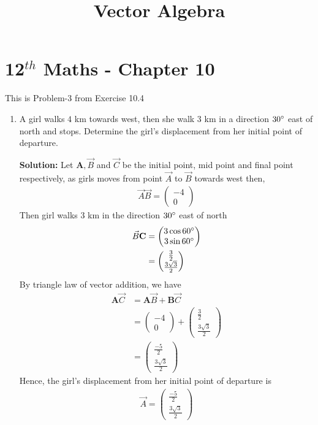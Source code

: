 \documentclass[12pt]{article}
\newcommand{\solution}{\noindent \textbf{Solution: }}
\newcommand{\myvec}[1]{\ensuremath{\begin{pmatrix}#1\end{pmatrix}}}
\let\vec\mathbf
\begin{document}
\begin{center}
\enlargethispage{-4cm}
\title{\textbf{Vector Algebra}}
\date{\vspace{-5ex}} %
\maketitle
\end{center}
\setcounter{page}{1}
\section*{12$^{th}$ Maths - Chapter 10}
This is Problem-3 from Exercise 10.4
\begin{enumerate}
\item A girl walks $4$ km towards west, then she walk $3$ km in a direction $30\degree$ east of north and stops. Determine the girl's displacement from her initial point of departure.

\solution 
Let $\vec{A}, \Vec{B}$ and $\Vec{C}$ be the initial point, mid point and final point respectively, as girls moves from point $\Vec{A}$ to $\Vec{B}$ towards west then,  
\begin{align}
 \Vec{A}\Vec{B}=\myvec{-4\\0}
\end{align}
Then girl walks 3 km in the direction $30\degree$ east of north
 \begin{align}
\Vec{B}\vec{C}&=\myvec{3\cos{60\degree}\\3\sin{60\degree}}\\
&=\myvec{\frac{3}{2}\\ \frac{3\sqrt{3}}{2}}
 \end{align}
 By triangle law of vector addition, we have
\begin{align}
 \vec{A}\Vec{C} &= \vec{A}\Vec{B}+\vec{B}\Vec{C}\\
 &=\myvec{-4\\0}+\myvec{\frac{3}{2}\\[2pt] \frac{3\sqrt{3}}{2}}\\
 &=\myvec{\frac{-5}{2}\\[2pt] \frac{3\sqrt{3}}{2}}
\end{align}
  Hence, the girl's displacement from her initial point of departure is 
\begin{align}
\Vec{A}=\myvec{\frac{-5}{2}\\[2pt] \frac{3\sqrt{3}}{2}}
\end{align}


\end{enumerate}
\end{document}
